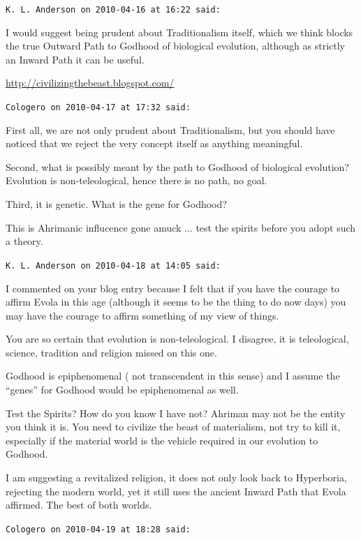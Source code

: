 \begin{footnotesize}
\begin{sffamily}
\texttt{K. L. Anderson on 2010-04-16 at 16:22 said:}

I would suggest being prudent about Traditionalism itself, which we think blocks the true Outward Path to Godhood of biological evolution, although as strictly an Inward Path it can be useful.

\url{http://civilizingthebeast.blogspot.com/}


\hfill

\texttt{Cologero on 2010-04-17 at 17:32 said:}

First all, we are not only prudent about Traditionalism, but you should have noticed that we reject the very concept itself as anything meaningful.

Second, what is possibly meant by the path to Godhood of biological evolution? Evolution is non-teleological, hence there is no path, no goal.

Third, it is genetic. What is the gene for Godhood?

This is Ahrimanic influcence gone amuck ... test the spirits before you adopt such a theory.

\hfill

\texttt{K. L. Anderson on 2010-04-18 at 14:05 said:}

I commented on your blog entry because I felt that if you have the courage to affirm Evola in this age (although it seems to be the thing to do now days) you may have the courage to affirm something of my view of things.

You are so certain that evolution is non-teleological. I disagree, it is teleological, science, tradition and religion missed on this one.

Godhood is epiphenomenal ( not transcendent in this sense) and I assume the ``genes'' for Godhood would be epiphenomenal as well.

Test the Spirits? How do you know I have not? Ahriman may not be the entity you think it is. You need to civilize the beast of materialism, not try to kill it, especially if the material world is the vehicle required in our evolution to Godhood.

I am suggesting a revitalized religion, it does not only look back to Hyperboria, rejecting the modern world, yet it still uses the ancient Inward Path that Evola affirmed. The best of both worlds.

\hfill

\texttt{Cologero on 2010-04-19 at 18:28 said:}


\end{sffamily}
\end{footnotesize}
